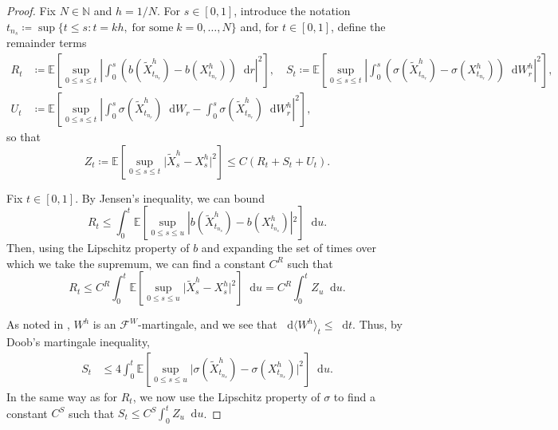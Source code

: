 \documentclass[10pt,a4paper]{amsart}
\def\E{{\mathbb E}}
\newcommand{\D}{\mathop{}\!\mathrm{d}}
\newcommand{\F}{\mathcal F}
\newcommand{\N}{\mathbb N}
\begin{document}
\begin{proof}
	Fix $N \in \N$ and $h = 1/N$. For $s \in [0, 1]$, introduce the notation $t_{n_s}\coloneqq  \sup\{t \leq s \colon t = kh, \; \text{for some}\; k = 0, \dotsc, N\}$ and, for $t \in [0, 1]$, define the remainder terms
	\begin{equation}
	\begin{split}
		R_t &\coloneqq  \E\!\left[\sup_{0 \leq s \leq t} \!\left \lvert \int_{0}^s \!\left(b(\tilde{X}^h_{t_{n_r}}) - b(X^h_{t_{n_r}})\right) \D r \right \rvert^2\right], \quad S_t\coloneqq  \E \!\left[\sup_{0 \leq s \leq t} \!\left \lvert \int_{0}^s \!\left(\sigma(\tilde{X}^h_{t_{n_r}}) - \sigma(X^h_{t_{n_r}})\right)\D W^h_r \right \rvert^2\right],\\
		U_t &\coloneqq  \E \!\left[\sup_{0 \leq s \leq t} \!\left \lvert \int_{0}^s \sigma(\tilde{X}^h_{t_{n_r}})\D W_r - \int_{0}^s\sigma(\tilde{X}^h_{t_{n_r}})\D W^h_r \right \rvert^2\right],
	\end{split}
	\end{equation}
	so that
	\begin{equation}
		Z_t\coloneqq  \E\!\left[\sup_{0 \leq s \leq t} \lvert \tilde{X}^h_s - X^h_s \rvert^2 \right] \leq C(R_t + S_t + U_t).
	\end{equation}	
	
	Fix $t \in [0, 1]$. By Jensen's inequality, we can bound
	\begin{equation}
		R_t \leq \int_0^t \E \!\left[ \sup_{0 \leq s \leq u} \!\left\lvert b(\tilde{X}^h_{t_{n_s}}) - b(X^h_{t_{n_s}}) \right\rvert\!^2\right] \D u.
	\end{equation}
	Then, using the Lipschitz property of $b$ and expanding the set of times over which we take the supremum, we can find a constant $C^R$ such that
	\begin{equation}
		R_t \leq C^R \int_0^t \E\!\left[\sup_{0 \leq s \leq u} \lvert \tilde{X}^h_s - X^h_s  \rvert^2 \right]\D u = C^R \int_0^t Z_u \D u.
	\end{equation}
	
	As noted in , $W^h$ is an $\F^W$-martingale, and we see that $\D \langle W^h\rangle_t \leq \D t$. Thus, by Doob's martingale inequality,
	\begin{equation}
	\begin{split}
		S_t & \leq 4 \int_0^t \E \!\left[ \sup_{0 \leq s \leq u} \lvert \sigma(\tilde{X}^h_{t_{n_s}}) - \sigma(X^h_{t_{n_s}}) \rvert^2\right] \D u.
	\end{split}
	\end{equation}
	In the same way as for $R_t$, we now use the Lipschitz property of $\sigma$ to find a constant $C^S$ such that $S_t \leq C^S \int_0^t Z_u \D u$.
	

\end{proof}
\end{document}

